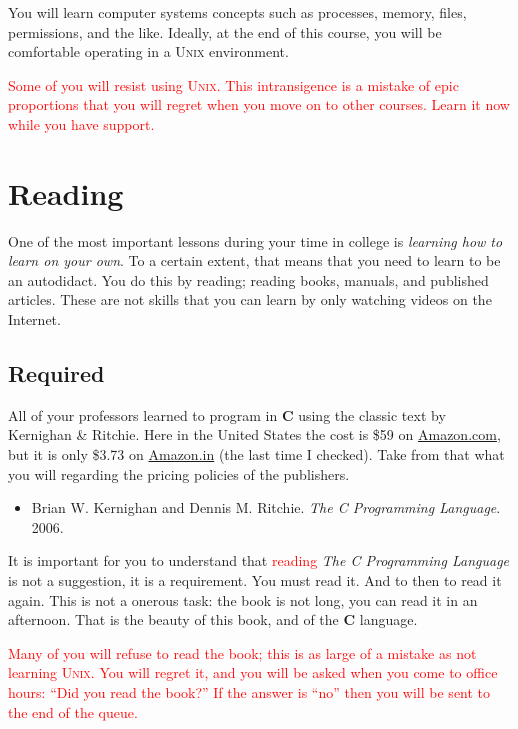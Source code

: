 \documentclass{article}
\begin{document}
You will learn computer systems concepts such as processes, memory,
files, permissions, and the like. Ideally, at the end of this course,
you will be comfortable operating in a \textsc{Unix} environment.

\textcolor{red}{Some of you will resist using \textsc{Unix}. This
intransigence is a mistake of epic proportions that you will regret when
you move on to other courses. Learn it now while you have support.}

\section{Reading}

One of the most important lessons during your time in college is
\emph{learning how to learn on your own}. To a certain extent, that
means that you need to learn to be an autodidact. You do this by
reading; reading books, manuals, and published articles. These are not
skills that you can learn by only watching videos on the Internet.

\subsection{Required}

All of your professors learned to program in \textbf{C} using the
classic text by Kernighan \& Ritchie.  Here in the United States the
cost is \$59 on \url{Amazon.com}, but it is only \$3.73 on
\url{Amazon.in} (the last time I checked).  Take from that what you will
regarding the pricing policies of the publishers.

\begin{itemize}
\item
Brian W. Kernighan and Dennis M. Ritchie. \emph{The C Programming Language}. 2006.
\end{itemize}

It is important for you to understand that \textcolor{red}{reading}
\emph{The C Programming Language} is not a suggestion, it is a
requirement. You must read it. And to then to read it again.  This is
not a onerous task: the book is not long, you can read it in an
afternoon. That is the beauty of this book, and of the \textbf{C}
language.

\textcolor{red}{Many of you will refuse to read the book; this is as
large of a mistake as not learning \textsc{Unix}. You will regret it,
and you will be asked when you come to office hours: ``Did you read the
book?'' If the answer is ``no'' then you will be sent to the end of the
queue.}
\end{document}
